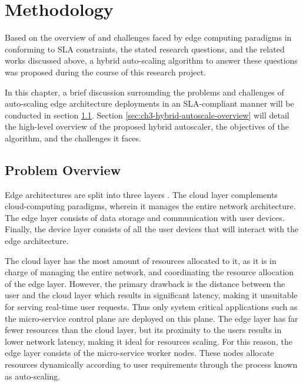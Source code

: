 \clearpage

\def\chaptertitle{Methodology}

\lhead{\emph{\chaptertitle}}

\chapter{\chaptertitle}
\label{ch:methodology}

Based on the overview of and challenges faced by edge computing paradigms in conforming to SLA constraints, the stated research questions, and the related works discussed above, a hybrid auto-scaling algorithm to answer these questions was proposed during the course of this research project.\par

In this chapter, a brief discussion surrounding the problems and challenges of auto-scaling edge architecture deployments in an SLA-compliant manner will be conducted in section \ref{sec:ch3-problem-overview}. Section \ref{sec:ch3-hybrid-autoscale-overview} will detail the high-level overview of the proposed hybrid autoscaler, the objectives of the algorithm, and the challenges it faces.

\section{Problem Overview}
\label{sec:ch3-problem-overview}

Edge architectures are split into three layers \cite{hamdan2020edge}. 
The cloud layer complements cloud-computing paradigms, wherein it manages the entire network architecture. The edge layer consists of data storage and communication with user devices. Finally, the device layer consists of all the user devices that will interact with the edge architecture.\par

The cloud layer has the most amount of resources allocated to it, as it is in charge of managing the entire network, and coordinating the resource allocation of the edge layer. However, the primary drawback is the distance between the user and the cloud layer which results in significant latency, making it unsuitable for serving real-time user requests. Thus only system critical applications such as the micro-service control plane are deployed on this plane. The edge layer has far fewer resources than the cloud layer, but its proximity to the users results in lower network latency, making it ideal for resources scaling. For this reason, the edge layer consists of the micro-service worker nodes. These nodes allocate resources dynamically according to user requirements through the process known as auto-scaling.\par

